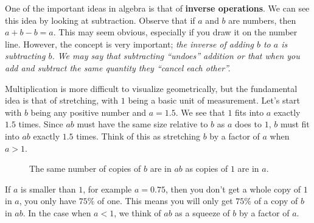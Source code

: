 One of the important ideas in algebra is that of {\bf inverse operations}. We can see this idea by looking at subtraction. Observe that if $a$ and $b$ are numbers, then $a+b-b = a$. This may seem obvious, especially if you draw it on the number line. However, the concept is very important; \itshape the inverse of adding  $b$ to $a$ is subtracting $b$. \upshape We may say that subtracting ``undoes'' addition or that when you add and subtract the same quantity they ``cancel each other''. 


\par 

Multiplication is more difficult to visualize  geometrically, but the fundamental idea is that of  stretching, with $1$ being a basic unit of measurement. Let's start with $b$ being any positive number and $a=1.5$.  We see that $1$ fits into $a$ exactly  $1.5$ times.  Since $ab$ must have the same size relative to $b$ as $a$ does to $1$, $b$ must fit into $ab$ exactly $1.5$ times. Think of this as stretching $b$ by a factor of $a$ when $a>1$.\\

\vspace{.2in} 
\begin{figure}[h]
\centering
{}
\caption{The same number of copies of $b$ are in $ab$ as copies of $1$ are in $a$.}
\label{fig:mult1}
\end{figure}


If $a$ is smaller than $1$, for example $a = 0.75$, then you don't get a whole copy of $1$ in $a$, you only have $75\%$ of one. This means you will only get $75\%$ of a copy of $b$ in $ab$. In the case when $a<1$, we think of $ab$ as a squeeze of $b$ by a factor of $a$.\\


